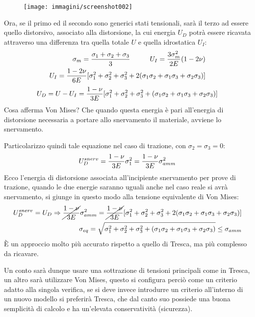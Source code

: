 \documentclass{article}
\begin{document}
\begin{adjustwidth}{2in}{}
	 	\begin{figure}[H]
	 		\centering
	 		\texttt{[image: immagini/screenshot002]}
	 		\label{fig:screenshot002}
	 	\end{figure}	 	
	 	
	 	Ora, se il primo ed il secondo sono generici stati tensionali, sarà il terzo ad essere quello distorsivo, associato alla distorsione, la cui energia $U_D$ potrà essere ricavata attraverso una differenza tra quella totale $U$ e quella idrostatica $U_I$:
	 	\begin{eqnarray*}
	 		\sigma_m = {\sigma_1+\sigma_2+\sigma_3\over3} \hspace{1cm} U_I = {3\sigma_m^2\over2E}(1-2\nu) \\	 		
	 		U_I = {1-2\nu\over6E}[\sigma_1^2 + \sigma_2^2 + \sigma_3^2 + 2(\sigma_1\sigma_2 + \sigma_1\sigma_3 + \sigma_2\sigma_3)] 	 		
	 	\end{eqnarray*}
 		\[U_D = U-U_I = {1-\nu\over3E}[\sigma_1^2 + \sigma_2^2 + \sigma_3^2 + (\sigma_1\sigma_2 + \sigma_1\sigma_3 + \sigma_2\sigma_3)] \]
	 	Cosa afferma Von Mises? Che quando questa energia è pari all'energia di distorsione necessaria a portare allo snervamento il materiale, avviene lo snervamento. \newline 
	 	
	 	Particolarizzo quindi tale equazione nel caso di trazione, con $\sigma_2=\sigma_3 = 0$:
	 	\[U_D^{snerv} = {1-\nu\over3E}\sigma_1^2 = {1-\nu\over3E}\sigma_{amm}^2 \]
	 	Ecco l'energia di distorsione associata all'incipiente snervamento per prove di trazione, quando le due energie saranno uguali anche nel caso reale si avrà snervamento, si giunge in questo modo alla tensione equivalente di Von Mises: 	 	
	 	\begin{eqnarray*}
	 	U_D^{snerv} = U_D \Rightarrow \cancel{{1-\nu\over3E}}\sigma_{amm}^2 = \cancel{{1-\nu\over3E}}[\sigma_1^2 + \sigma_2^2 + \sigma_3^2 + 2(\sigma_1\sigma_2 + \sigma_1\sigma_3 + \sigma_2\sigma_3)] \\
	 	\sigma_{eq} = \sqrt{\sigma_1^2 + \sigma_2^2 + \sigma_3^2 + (\sigma_1\sigma_2 + \sigma_1\sigma_3 + \sigma_2\sigma_3)} \leq \sigma_{amm}
	 	\end{eqnarray*}	
 		È un approccio molto più accurato rispetto a quello di Tresca, ma più complesso da ricavare. 
 		
 		Un conto sarà dunque usare una sottrazione di tensioni principali come in Tresca, un altro sarà utilizzare Von Mises, questo si configura perciò come un criterio adatto alla singola verifica, se si deve invece introdurre un criterio all'interno di un nuovo modello si preferirà Tresca, che dal canto suo possiede una buona semplicità di calcolo e ha un'elevata conservatività (sicurezza). 
 		

\end{adjustwidth}
\end{document}
